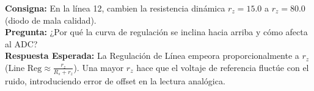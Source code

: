 \documentclass[11pt, a4paper]{article}
\begin{document}
\begin{aviso}
\textbf{Consigna:} En la línea 12, cambien la resistencia dinámica $r_z = 15.0$ a $r_z = 80.0$ (diodo de mala calidad).\\
\textbf{Pregunta:} ¿Por qué la curva de regulación se inclina hacia arriba y cómo afecta al ADC? \\
\textbf{Respuesta Esperada:} La Regulación de Línea empeora proporcionalmente a $r_z$ ($\text{Line Reg} \approx \frac{r_z}{R_s + r_z}$). Una mayor $r_z$ hace que el voltaje de referencia fluctúe con el ruido, introduciendo error de offset en la lectura analógica.
\end{aviso}
\end{document}
